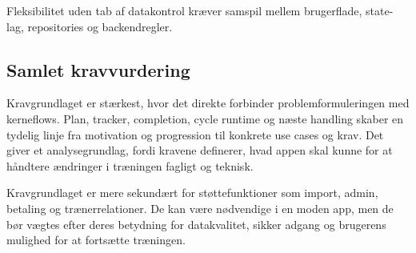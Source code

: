 Fleksibilitet uden tab af datakontrol kræver samspil mellem brugerflade, state-lag, repositories og backendregler.

\subsection{Samlet kravvurdering}

Kravgrundlaget er stærkest, hvor det direkte forbinder problemformuleringen med kerneflows. Plan, tracker, completion, cycle runtime og næste handling skaber en tydelig linje fra motivation og progression til konkrete use cases og krav. Det giver et analysegrundlag, fordi kravene definerer, hvad appen skal kunne for at håndtere ændringer i træningen fagligt og teknisk.

Kravgrundlaget er mere sekundært for støttefunktioner som import, admin, betaling og trænerrelationer. De kan være nødvendige i en moden app, men de bør vægtes efter deres betydning for datakvalitet, sikker adgang og brugerens mulighed for at fortsætte træningen.

